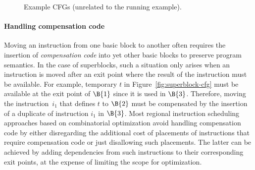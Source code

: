 \documentclass[acmsmall,authorversion,nonacm]{acmart}
\begin{document}
\begin{figure}
{{{
 }}
    \label{fig:general-cfg}
  }
  \hspace{0.1cm}
  \hfill
  \caption{Example CFGs (unrelated to the running example).}
\end{figure}

\paragraph{Handling compensation code}

Moving an instruction from one basic block to another often requires
the insertion of \emph{compensation code} into yet other basic blocks
to preserve program semantics.
In the case of superblocks, such a situation only arises when an
instruction is moved after an exit point where the result of the
instruction must be available.
For example, temporary $t$ in Figure~\ref{fig:superblock-cfg} must be
available at the exit point of $\B{1}$ since it is used in $\B{3}$.
Therefore, moving the instruction~$i_1$ that defines $t$ to $\B{2}$
must be compensated by the insertion of a duplicate of instruction
$i_1$ in $\B{3}$.
Most regional instruction scheduling approaches based on combinatorial
optimization avoid handling compensation code by either disregarding
the additional cost of placements of instructions that require
compensation code or just disallowing such placements.
The latter can be achieved by adding dependencies from such
instructions to their corresponding exit points, at the expense of
limiting the scope for optimization.
\end{document}

